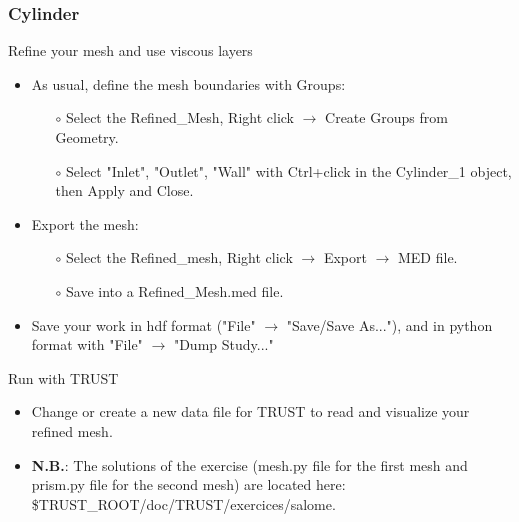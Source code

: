 \documentclass[10pt, hyperref={unicode=true,pdfusetitle, bookmarks=true,bookmarksnumbered=false,bookmarksopen=false, breaklinks=false,pdfborder={0 0 1},backref=true,colorlinks=true,linkcolor=darkblue,pageanchor}]{beamer}
\begin{document}
\begin{frame}
\frametitle{Cylinder}

\begin{block}{Refine your mesh and use viscous layers}
\begin{itemize}
\item As usual, define the mesh boundaries with Groups:
    \begin{itemize}
    \item [$\circ$] Select the Refined\_Mesh, Right click $\rightarrow$ Create Groups from Geometry.
    \item [$\circ$] Select "Inlet", "Outlet", "Wall" with Ctrl+click in the Cylinder\_1 object, then Apply and Close.
    \end{itemize}

\item Export the mesh:
    \begin{itemize}
    \item [$\circ$] Select the Refined\_mesh, Right click $\rightarrow$ Export $\rightarrow$ MED file.
    \item [$\circ$] Save into a Refined\_Mesh.med file.
    \end{itemize}

\item Save your work in hdf format ("File" $\rightarrow$ "Save/Save As..."), and in python format with "File" $\rightarrow$ "Dump Study..."
\end{itemize}
\end{block}


\begin{block}{Run with TRUST}
\begin{itemize}
\item Change or create a new data file for TRUST to read and visualize your refined mesh.

\item \textbf{N.B.}: The solutions of the exercise (mesh.py file for the first mesh and prism.py file for the second mesh) are located here: \$TRUST\_ROOT/doc/TRUST/exercices/salome.
\end{itemize}

\end{block}
\end{frame}
\end{document}
